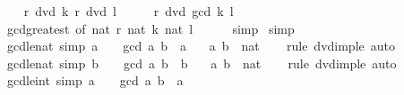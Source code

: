 \begin{isabellebody}
\ \ \isamarkupfalse%
\ {\isachardoublequoteopen}r\ dvd\ k{\isachardoublequoteclose}\ {\isachardoublequoteopen}r\ dvd\ l{\isachardoublequoteclose}\isanewline
\ \ \isamarkupfalse%
\ \isamarkupfalse%
\ {\isachardoublequoteopen}r\ dvd\ gcd\ k\ l{\isachardoublequoteclose}\isanewline
\ \ \ \ \isamarkupfalse%
\ gcd{\isacharunderscore}{\kern0pt}greatest\ {\isacharbrackleft}{\kern0pt}of\ {\isachardoublequoteopen}nat\ {\isasymbar}r{\isasymbar}{\isachardoublequoteclose}\ {\isachardoublequoteopen}nat\ {\isasymbar}k{\isasymbar}{\isachardoublequoteclose}\ {\isachardoublequoteopen}nat\ {\isasymbar}l{\isasymbar}{\isachardoublequoteclose}{\isacharbrackright}{\kern0pt}\isanewline
\ \ \ \ \isamarkupfalse%
\ simp\isanewline
{}\isamarkupfalse%
\ simp%
\endisatagproof
{\isafoldproof}%
%
\isadelimproof
\isanewline
%
\endisadelimproof
\isanewline
{}\isamarkupfalse%
\ gcd{\isacharunderscore}{\kern0pt}le{}{\isacharunderscore}{\kern0pt}nat\ {\isacharbrackleft}{\kern0pt}simp{\isacharbrackright}{\kern0pt}{\isacharcolon}{\kern0pt}\ {\isachardoublequoteopen}a\ {\isasymnoteq}\ {}\ {\isasymLongrightarrow}\ gcd\ a\ b\ {\isasymle}\ a{\isachardoublequoteclose}\isanewline
\ \ \ a\ b\ {\isacharcolon}{\kern0pt}{\isacharcolon}{\kern0pt}\ nat\isanewline
%
\isadelimproof
\ \ %
\endisadelimproof
%
\isatagproof
{}\isamarkupfalse%
\ {\isacharparenleft}{\kern0pt}rule\ dvd{\isacharunderscore}{\kern0pt}imp{\isacharunderscore}{\kern0pt}le{\isacharparenright}{\kern0pt}\ auto%
\endisatagproof
{\isafoldproof}%
%
\isadelimproof
\isanewline
%
\endisadelimproof
\isanewline
{}\isamarkupfalse%
\ gcd{\isacharunderscore}{\kern0pt}le{}{\isacharunderscore}{\kern0pt}nat\ {\isacharbrackleft}{\kern0pt}simp{\isacharbrackright}{\kern0pt}{\isacharcolon}{\kern0pt}\ {\isachardoublequoteopen}b\ {\isasymnoteq}\ {}\ {\isasymLongrightarrow}\ gcd\ a\ b\ {\isasymle}\ b{\isachardoublequoteclose}\isanewline
\ \ \ a\ b\ {\isacharcolon}{\kern0pt}{\isacharcolon}{\kern0pt}\ nat\isanewline
%
\isadelimproof
\ \ %
\endisadelimproof
%
\isatagproof
{}\isamarkupfalse%
\ {\isacharparenleft}{\kern0pt}rule\ dvd{\isacharunderscore}{\kern0pt}imp{\isacharunderscore}{\kern0pt}le{\isacharparenright}{\kern0pt}\ auto%
\endisatagproof
{\isafoldproof}%
%
\isadelimproof
\isanewline
%
\endisadelimproof
\isanewline
{}\isamarkupfalse%
\ gcd{\isacharunderscore}{\kern0pt}le{}{\isacharunderscore}{\kern0pt}int\ {\isacharbrackleft}{\kern0pt}simp{\isacharbrackright}{\kern0pt}{\isacharcolon}{\kern0pt}\ {\isachardoublequoteopen}a\ {\isachargreater}{\kern0pt}\ {}\ {\isasymLongrightarrow}\ gcd\ a\ b\ {\isasymle}\ a{\isachardoublequoteclose}\isanewline

\end{isabellebody}
